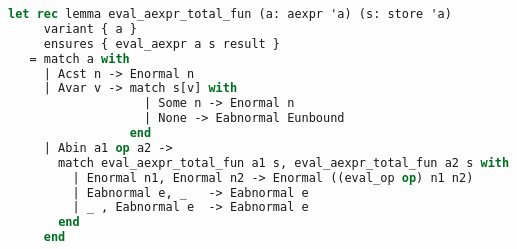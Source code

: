 \begin{lstlisting}[caption={Lemma combining totality and determinism for arithmetic expressions},label={lst:why3totfun},language=sml]
let rec lemma eval_aexpr_total_fun (a: aexpr 'a) (s: store 'a)
     variant { a }
     ensures { eval_aexpr a s result }
   = match a with
     | Acst n -> Enormal n
     | Avar v -> match s[v] with
                   | Some n -> Enormal n
                   | None -> Eabnormal Eunbound
                 end
     | Abin a1 op a2 ->
       match eval_aexpr_total_fun a1 s, eval_aexpr_total_fun a2 s with
         | Enormal n1, Enormal n2 -> Enormal ((eval_op op) n1 n2)
         | Eabnormal e, _   -> Eabnormal e
         | _ , Eabnormal e  -> Eabnormal e
       end
     end
\end{lstlisting}
